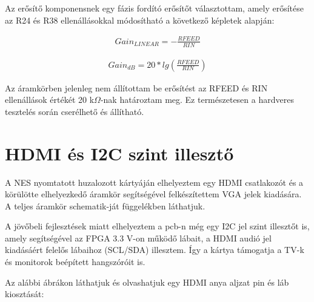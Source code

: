 	Az erősítő komponensnek egy fázis fordító erősítőt választottam, amely erősítése az R24 és R38 ellenállásokkal módosítható a következő képletek alapján:
	
	\begin{align}	
		Gain_{LINEAR} = -\frac{RFEED}{RIN}
	\end{align} 
	
	\begin{align}	
		Gain_{dB} = 20 * lg(\frac{RFEED}{RIN})
	\end{align}
 
	Az áramkörben jelenleg nem állítottam be erősítést az RFEED és RIN ellenállások értékét 20 k$\Omega$-nak határoztam meg. Ez természetesen a hardveres tesztelés során cserélhető és állítható.	
	
\section{HDMI és I2C szint illesztő}
	\label{sec:HMI-I2C}
	
	A NES nyomtatott huzalozott kártyáján elhelyeztem egy HDMI csatlakozót és a körülötte elhelyezkedő áramkör segítségével felkészítettem VGA jelek kiadására. A teljes áramkör schematik-ját  függelékben láthatjuk.
	
	A jövőbeli fejlesztések miatt elhelyeztem a pcb-n még egy I2C jel szint illesztőt is, amely segítségével az FPGA 3.3 V-on működő lábait, a HDMI audió jel kiadásáért felelős lábaihoz (SCL/SDA) illesztem. Így a kártya támogatja a TV-k és monitorok beépített hangszóróit is. 
	
	Az alábbi ábrákon láthatjuk és olvashatjuk egy HDMI anya aljzat pin és láb kiosztását:   
	
